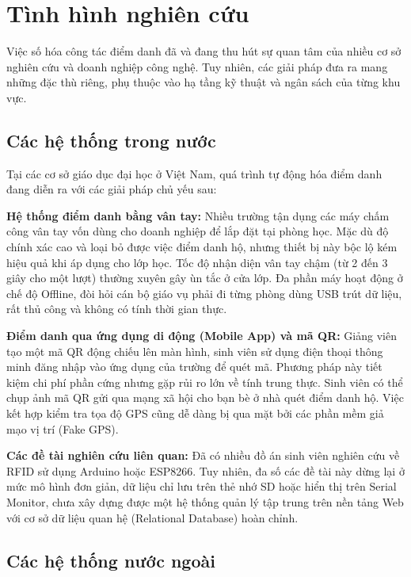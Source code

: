 \documentclass[12pt,a4paper]{report}
\begin{document}
\section{Tình hình nghiên cứu}

Việc số hóa công tác điểm danh đã và đang thu hút sự quan tâm của nhiều cơ sở nghiên cứu và doanh nghiệp công nghệ. Tuy nhiên, các giải pháp đưa ra mang những đặc thù riêng, phụ thuộc vào hạ tầng kỹ thuật và ngân sách của từng khu vực.

\subsection{Các hệ thống trong nước}

Tại các cơ sở giáo dục đại học ở Việt Nam, quá trình tự động hóa điểm danh đang diễn ra với các giải pháp chủ yếu sau:

\textbf{Hệ thống điểm danh bằng vân tay:}  
Nhiều trường tận dụng các máy chấm công vân tay vốn dùng cho doanh nghiệp để lắp đặt tại phòng học. Mặc dù độ chính xác cao và loại bỏ được việc điểm danh hộ, nhưng thiết bị này bộc lộ kém hiệu quả khi áp dụng cho lớp học. Tốc độ nhận diện vân tay chậm (từ 2 đến 3 giây cho một lượt) thường xuyên gây ùn tắc ở cửa lớp. Đa phần máy hoạt động ở chế độ Offline, đòi hỏi cán bộ giáo vụ phải đi từng phòng dùng USB trút dữ liệu, rất thủ công và không có tính thời gian thực.

\textbf{Điểm danh qua ứng dụng di động (Mobile App) và mã QR:}  
Giảng viên tạo một mã QR động chiếu lên màn hình, sinh viên sử dụng điện thoại thông minh đăng nhập vào ứng dụng của trường để quét mã. Phương pháp này tiết kiệm chi phí phần cứng nhưng gặp rủi ro lớn về tính trung thực. Sinh viên có thể chụp ảnh mã QR gửi qua mạng xã hội cho bạn bè ở nhà quét điểm danh hộ. Việc kết hợp kiểm tra tọa độ GPS cũng dễ dàng bị qua mặt bởi các phần mềm giả mạo vị trí (Fake GPS).

\textbf{Các đề tài nghiên cứu liên quan:}  
Đã có nhiều đồ án sinh viên nghiên cứu về RFID sử dụng Arduino hoặc ESP8266. Tuy nhiên, đa số các đề tài này dừng lại ở mức mô hình đơn giản, dữ liệu chỉ lưu trên thẻ nhớ SD hoặc hiển thị trên Serial Monitor, chưa xây dựng được một hệ thống quản lý tập trung trên nền tảng Web với cơ sở dữ liệu quan hệ (Relational Database) hoàn chỉnh.

\subsection{Các hệ thống nước ngoài}
\end{document}
